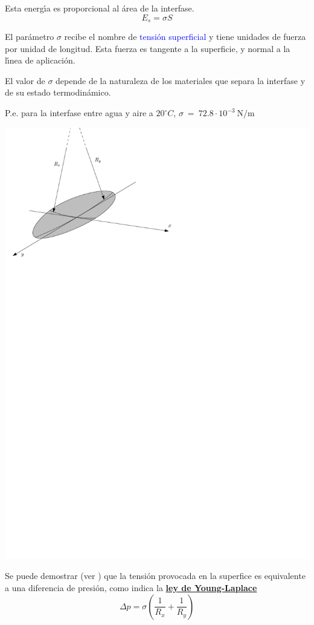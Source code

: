Esta energ\'{\i}a es proporcional al \'area de la interfase.
\begin{equation}
	 E_s = \sigma S
\end{equation} 

El par\'ametro $\sigma$ recibe el nombre de \textcolor{blue}{tensi\'on superficial} y tiene unidades de fuerza por
unidad de longitud. Esta fuerza es tangente a la superficie, y normal a la l\'{\i}nea de aplicaci\'on.

El valor de $\sigma$ depende de la naturaleza de los materiales que separa la interfase y de su estado termodin\'amico.

P.e. para la interfase entre agua y aire a $20^\circ C$, $\sigma~=~72.8\cdot10^{-3}~\text{N/m}$


\begin{center}
\includegraphics{TeX_files/chapter01-Introduccion/YoungLaplace}
\end{center}
Se puede demostrar (ver \cite{Bat}) que la tensi\'on provocada en la superfice es equivalente a una diferencia
de presi\'on, como indica la \href{https://es.wikipedia.org/wiki/Ley_de_Laplace}{\textbf{ley de Young-Laplace}}
\begin{equation}
	\Delta p = \sigma\left(\frac{1}{R_x}+\frac{1}{R_y}\right)
\end{equation}


